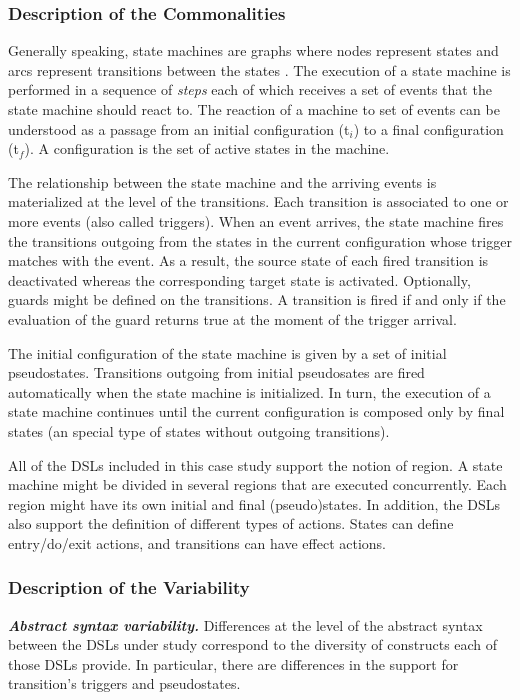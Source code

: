 \subsubsection{Description of the Commonalities}

Generally speaking, state machines are graphs where nodes represent states and arcs represent transitions between the states \cite{Harel:1987}. The execution of a state machine is performed in a sequence of \textit{steps} each of which receives a set of events that the state machine should react to. The reaction of a machine to set of events can be understood as a passage from an initial configuration (t$_i$) to a final configuration (t$_{f}$). A configuration is the set of active states in the machine.

The relationship between the state machine and the arriving events is materialized at the level of the transitions. Each transition is associated to one or more events (also called triggers). When an event arrives, the state machine fires the transitions outgoing from the states in the current configuration whose trigger matches with the event. As a result, the source state of each fired transition is deactivated whereas the corresponding target state is activated. Optionally, guards might be defined on the transitions. A transition is fired if and only if the evaluation of the guard returns true at the moment of the trigger arrival.

The initial configuration of the state machine is given by a set of initial pseudostates.  Transitions outgoing from initial pseudosates are fired automatically when the state machine is initialized. In turn, the execution of a state machine continues until the current configuration is composed only by final states (an special type of states without outgoing transitions).

All of the DSLs included in this case study support the notion of region. A state machine might be divided in several regions that are executed concurrently. Each region might have its own initial and final (pseudo)states. In addition, the DSLs also support the definition of different types of actions. States can define entry/do/exit actions, and transitions can have effect actions.

\subsubsection{Description of the Variability}

\vspace{2mm}
\textit{\textbf{Abstract syntax variability.}} Differences at the level of the abstract syntax between the DSLs under study correspond to the diversity of constructs each of those DSLs provide. In particular, there are differences in the support for transition's triggers and pseudostates.


